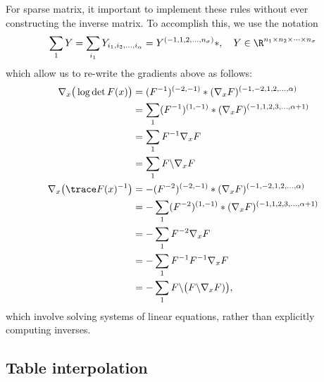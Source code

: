 \documentclass[11pt]{article}
\theoremstyle{remark}
\begin{document}
For sparse matrix, it important to implement these rules without ever
constructing the inverse matrix. To accomplish this, we use the notation
\begin{align*}
  \sum_1 Y = \sum_{i_1} Y_{i_1,i_2,\dots,i_\alpha} = Y^{(-1,1,2,\dots,n_\sigma)} *,
  \quad
  Y\in\R^{n_1\times n_2 \times\cdots \times n_\sigma}
\end{align*}
which allow us to re-write the gradients above as follows:
\begin{align*}
  \nabla_x \big(\log\det F (x)\big)
  &= (F^{-1})^{(-2,-1)} * (\nabla_x F)^{(-1,-2,1,2,\dots,\alpha)} \\
  &=\sum_1(F^{-1})^{(1,-1)} * (\nabla_x F)^{(-1,1,2,3,\dots,\alpha+1)}\\
  &=\sum_1F^{-1} \nabla_x F\\
  &=\sum_1F\backslash \nabla_x F\\
  \nabla_x \big(\trace F(x)^{-1}\big)
  &= -(F^{-2})^{(-2,-1)} * (\nabla_x F)^{(-1,-2,1,2,\dots,\alpha)} \\
  &= -\sum_1(F^{-2})^{(1,-1)} *( \nabla_x F)^{(-1,1,2,3,\dots,\alpha+1)} \\
  &= -\sum_1 F^{-2} \nabla_x F\\
  &= -\sum_1 F^{-1}F^{-1} \nabla_x F\\
  &= -\sum_1 F\backslash\big( F\backslash\nabla_x F)\big),
\end{align*}
which involve solving systems of linear equations, rather than
explicitly computing inverses.

\subsection{Table interpolation}
\end{document}
